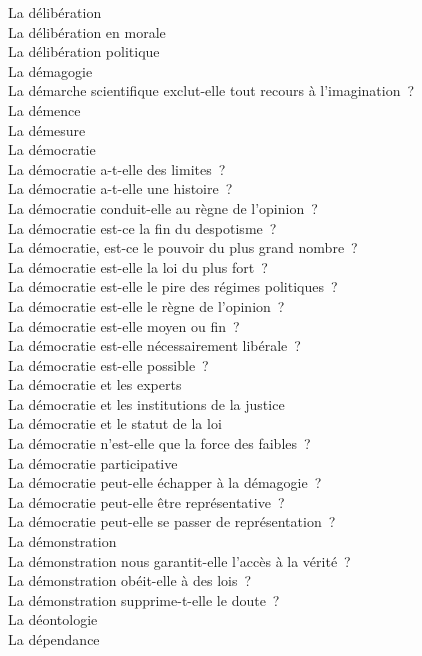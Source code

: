 \documentclass[a4paper,12pt]{article}
\begin{document}
La délibération \\
La délibération en morale \\
La délibération politique \\
La démagogie \\
La démarche scientifique exclut-elle tout recours à l'imagination ? \\
La démence \\
La démesure \\
La démocratie \\
La démocratie a-t-elle des limites ? \\
La démocratie a-t-elle une histoire ? \\
La démocratie conduit-elle au règne de l'opinion ? \\
La démocratie est-ce la fin du despotisme ? \\
La démocratie, est-ce le pouvoir du plus grand nombre ? \\
La démocratie est-elle la loi du plus fort ? \\
La démocratie est-elle le pire des régimes politiques ? \\
La démocratie est-elle le règne de l'opinion ? \\
La démocratie est-elle moyen ou fin ? \\
La démocratie est-elle nécessairement libérale ? \\
La démocratie est-elle possible ? \\
La démocratie et les experts \\
La démocratie et les institutions de la justice \\
La démocratie et le statut de la loi \\
La démocratie n'est-elle que la force des faibles ? \\
La démocratie participative \\
La démocratie peut-elle échapper à la démagogie ? \\
La démocratie peut-elle être représentative ? \\
La démocratie peut-elle se passer de représentation ? \\
La démonstration \\
La démonstration nous garantit-elle l'accès à la vérité ? \\
La démonstration obéit-elle à des lois ? \\
La démonstration supprime-t-elle le doute ? \\
La déontologie \\
La dépendance \\
\end{document}
